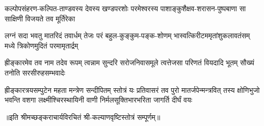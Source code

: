 \fourlineindentedshloka
{कल्पोपसंहरण-कल्पित-ताण्डवस्य}
{देवस्य खण्डपरशोः परमेश्वरस्य}
{पाशाङ्कुशैक्षव-शरासन-पुष्पबाणा}
{सा साक्षिणी विजयते तव मूर्तिरेका}%

\fourlineindentedshloka
{लग्नं सदा भवतु मातरिदं तवार्धम्}
{तेजः परं बहुल-कुङ्कुम-पङ्क-शोणम्}
{भास्वत्किरीटममृतांशुकलावतंसम्}
{मध्ये त्रिकोणमुदितं परमामृतार्द्रम्}%

\fourlineindentedshloka
{ह्रीङ्कारमेव तव नाम तदेव रूपम्}
{त्वन्नाम सुन्दरि सरोजनिवासमूले}
{त्वत्तेजसा परिणतं वियदादि भूतम्}
{सौख्यं तनोति सरसीरुहसम्भवादेः}%

\fourlineindentedshloka
{ह्रीङ्कारत्रयसम्पुटेन महता मन्त्रेण सन्दीपितम्}
{स्तोत्रं यः प्रतिवासरं तव पुरो मातर्जपेन्मन्त्रवित्}
{तस्य क्षोणिभुजो भवन्ति वशगा लक्ष्मीश्चिरस्थायिनी}
{वाणी निर्मलसूक्तिभारभरिता जागर्ति दीर्घं वयः}%
 
॥इति श्रीमच्छङ्कराचार्यविरचितं श्री-कल्याणवृष्टिस्तोत्रं  सम्पूर्णम्॥